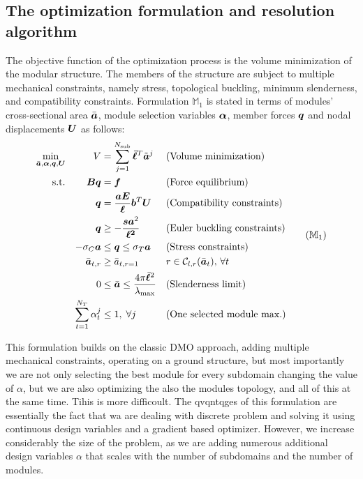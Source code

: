 \subsection{The optimization formulation and resolution algorithm}
The objective function of the optimization process is the volume minimization of the modular structure. 
The members of the structure are subject to multiple mechanical constraints, namely stress, topological buckling, minimum slenderness, and compatibility constraints. Formulation $\mathbb{M}_1$ is stated in terms of modules' cross-sectional area $\bar{\bm{a}}$, module selection variables $\bm{\alpha}$, member forces $\bm{q}$ and nodal displacements $\bm{U}$ as follows:
\begin{equation}
    \begin{aligned}
    \min_{\bar{\vect{a}}, \vect{\alpha}, \bm{q}, \bm{U}}   && V &= \sum_{j=1}^{N_{\text{sub}}}\vect{\bar{\ell}}^T\tilde{\vect{a}}^j && \textrm{(Volume minimization)}\\
    \textrm{s.t.}   && \bm{B}\bm{q} &= \bm{f} && \textrm{(Force equilibrium)}\\
                    && \bm{q} &= \frac{\bm{a}\bm{E}}{\bm{\ell}}\bm{b}^T\bm{U} && \textrm{(Compatibility constraints)} \\
                    && \bm{q} &\geq -\frac{\bm{s}\bm{a}^2}{\bm{\ell^2}} && \textrm{(Euler buckling constraints)} \\
                    && -\sigma_C\bm{a} &\leq \bm{q} \leq \sigma_T\bm{a} && \textrm{(Stress constraints)} \\
                    && \bar{\vect{a}}_{t,r}&\geq \bar{a}_{t,r=1} && r \in \mathcal{C}_{l,r}(\bar{\vect{a}}_t),\, \forall t \\
                    && 0 &\leq \bar{\vect{a}} \leq \frac{4 \pi \bar{\vect{\ell}}^2}{\lambda_{\text{max}}} && \textrm{(Slenderness limit)} \\
                    && \sum_{t=1}^{N_T} \alpha_t^j &\leq 1, \; \forall j && \textrm{(One selected module max.)} \\
    \end{aligned}
    \tag{$\mathbb{M}_1$}
    \label{eq:06_optim_complete}
\end{equation}

This formulation builds on the classic DMO approach, adding multiple mechanical constraints, operating on a ground structure, but most importantly we are not only selecting the best module for every subdomain changing the value of $\alpha$, but we are also optimizing the also the modules topology, and all of this at the same time. Tihis is more difficoult. The qvqntqges of this formulation are essentially the fact that wa are dealing with discrete problem and solving it using continuous design variables and a gradient based optimizer. However, we increase considerably the size of the problem, as we are adding numerous additional design variables $\alpha$ that scales with the number of subdomains and the number of modules.


